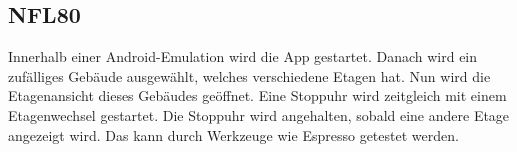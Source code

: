 \subsection*{NFL80}

Innerhalb einer \Gls{Android}-\Gls{Emulation} wird die App gestartet.
Danach wird ein zufälliges Gebäude ausgewählt, welches verschiedene Etagen hat.
Nun wird die Etagenansicht dieses Gebäudes geöffnet.
Eine Stoppuhr wird zeitgleich mit einem Etagenwechsel gestartet.
Die Stoppuhr wird angehalten, sobald eine andere Etage angezeigt wird.
Das kann durch Werkzeuge wie \Gls{Espresso} getestet werden.